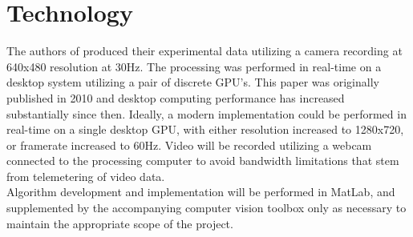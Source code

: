 \section{Technology}

The authors of \cite{newcombe2010live} produced their experimental data utilizing a camera recording at 640x480 resolution at 30Hz. The processing was performed in real-time on a desktop system utilizing a pair of discrete GPU's. This paper was originally published in 2010 and desktop computing performance has increased substantially since then. Ideally, a modern implementation could be performed in real-time on a single desktop GPU, with either resolution increased to 1280x720, or framerate increased to 60Hz. Video will be recorded utilizing a webcam connected to the processing computer to avoid bandwidth limitations that stem from telemetering of video data. \\


Algorithm development and implementation will be performed in MatLab, and supplemented by the accompanying computer vision toolbox only as necessary to maintain the appropriate scope of the project.
